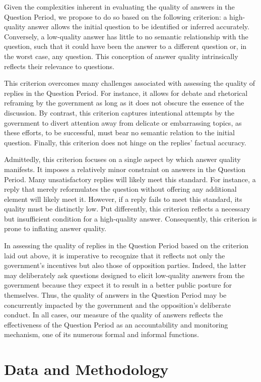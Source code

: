 {{Given the complexities inherent in evaluating the quality of answers in the Question Period, we propose to do so based on the following criterion: a high-quality answer allows the initial question to be identified or inferred accurately. Conversely, a low-quality answer has little to no semantic relationship with the question, such that it could have been the answer to a different question or, in the worst case, any question. This conception of answer quality intrinsically reflects their relevance to questions.

This criterion overcomes many challenges associated with assessing the quality of replies in the Question Period. For instance, it allows for debate and rhetorical reframing by the government as long as it does not obscure the essence of the discussion. By contrast, this criterion captures intentional attempts by the government to divert attention away from delicate or embarrassing topics, as these efforts, to be successful, must bear no semantic relation to the initial question. Finally, this criterion does not hinge on the replies’ factual accuracy.

Admittedly, this criterion focuses on a single aspect by which answer quality manifests. It imposes a relatively minor constraint on answers in the Question Period. Many unsatisfactory replies will likely meet this standard. For instance, a reply that merely reformulates the question without offering any additional element will likely meet it. However, if a reply fails to meet this standard, its quality must be distinctly low. Put differently, this criterion reflects a necessary but insufficient condition for a high-quality answer. Consequently, this criterion is prone to inflating answer quality.

In assessing the quality of replies in the Question Period based on the criterion laid out above, it is imperative to recognize that it reflects not only the government’s incentives but also those of opposition parties. Indeed, the latter may deliberately ask questions designed to elicit low-quality answers from the government because they expect it to result in a better public posture for themselves. Thus, the quality of answers in the Question Period may be concurrently impacted by the government and the opposition’s deliberate conduct. In all cases, our measure of the quality of answers reflects the effectiveness of the Question Period as an accountability and monitoring mechanism, one of its numerous formal and informal functions.

\section*{Data and Methodology}

}}
